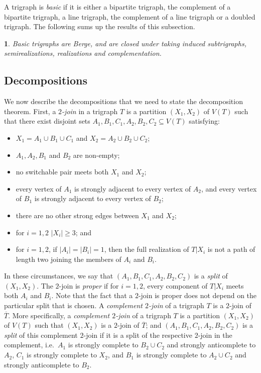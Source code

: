 \documentclass[11 pt] {article}
\newtheorem{lemma}[theorem]{}
\begin{document}
A trigraph is \emph{basic} if it is either a bipartite trigraph, the
complement of a bipartite trigraph, a line trigraph, the complement of
a line trigraph or a doubled trigraph.  The following sums up the
results of this subsection.

\begin{lemma}
  \label{l:presBas}
  Basic trigraphs are Berge, and are closed under taking induced
  subtrigraphs, semirealizations, realizations and complementation.
\end{lemma}

\subsection{Decompositions}

We now describe the decompositions that we need to state the
decomposition theorem. First, a {\em $2$-join} in a trigraph $T$ is a
partition $(X_1, X_2)$ of $V(T)$ such that there exist disjoint sets
$A_1, B_1, C_1, A_2, B_2, C_2 \subseteq V(T)$ satisfying:

\begin{itemize}
\item $X_1=A_1\cup B_1\cup C_1$ and $X_2=A_2\cup B_2\cup C_2$;
\item $A_1, A_2, B_1$ and $B_2$ are non-empty;
\item no switchable pair meets both $X_1$ and $X_2$;
\item every vertex of $A_1$ is strongly adjacent to every vertex of
  $A_2$, and every vertex of $B_1$ is strongly adjacent to every
  vertex of $B_2$;
\item there are no other strong edges between $X_1$ and $X_2$; 
\item for $i=1,2$ $|X_i| \geq 3$; and 
\item for $i = 1,2$, if $|A_i| = |B_i| = 1$, then the full realization of
$T|X_i$ is not a path of length two joining the members of $A_i$ and $B_i$.
\end{itemize}

In these circumstances, we say that $(A_1, B_1, C_1, A_2, B_2, C_2)$
is a \emph{split} of $(X_1, X_2)$. The $2$-join is \emph{proper} if
for $i = 1,2$, every component of $T|X_i$ meets both $A_i$ and
$B_i$. Note that the fact that a $2$-join is proper does not depend on
the particular split that is chosen. A \emph{complement $2$-join} of a
trigraph $T$ is a $2$-join of $\overline{T}$.  More specifically, a
{\em complement $2$-join} of a trigraph $T$ is a partition $(X_1, X_2)$
of $V(T)$ such that $(X_1, X_2)$ is a $2$-join of $\overline{T}$; and
$(A_1,B_1,C_1,A_2,B_2,C_2)$ is a {\em split} of this complement $2$-join
if it is a split of the respective $2$-join in the complement, i.e.\
$A_1$ is strongly complete to $B_2\cup C_2$ and strongly anticomplete
to $A_2$, $C_1$ is strongly complete to $X_2$, and $B_1$ is strongly
complete to $A_2 \cup C_2$ and strongly anticomplete to $B_2$.
\end{document}
